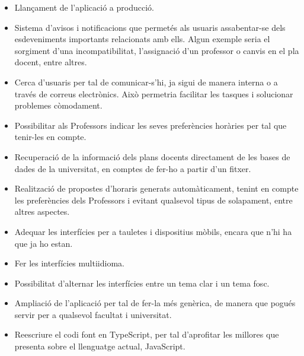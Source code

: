 \documentclass[a4paper,12pt]{ThesisStyle}
\begin{document}
\begin{itemize}
  \item Llançament de l'aplicació a producció.
  \item Sistema d'avisos i notificacions que permetés als usuaris assabentar-se dels esdeveniments importants relacionats amb ells. Algun exemple seria el sorgiment d'una incompatibilitat, l'assignació d'un professor o canvis en el pla docent, entre altres.
  \item Cerca d'usuaris per tal de comunicar-s'hi, ja sigui de manera interna o a través de correus electrònics. Això permetria facilitar les tasques i solucionar problemes còmodament.
  \item Possibilitar als Professors indicar les seves preferències horàries per tal que tenir-les en compte.
  \item Recuperació de la informació dels plans docents directament de les bases de dades de la universitat, en comptes de fer-ho a partir d'un fitxer.
  \item Realització de propostes d'horaris generats automàticament, tenint en compte les preferències dels Professors i evitant qualsevol tipus de solapament, entre altres aspectes.
  \item Adequar les interfícies per a tauletes i dispositius mòbils, encara que n'hi ha que ja ho estan.
  \item Fer les interfícies multiidioma.
  \item Possibilitat d'alternar les interfícies entre un tema clar i un tema fosc.
  \item Ampliació de l'aplicació per tal de fer-la més genèrica, de manera que pogués servir per a qualsevol facultat i universitat.
  \item Reescriure el codi font en TypeScript, per tal d'aprofitar les millores que presenta sobre el llenguatge actual, JavaScript.
\end{itemize}


\backmatter



\end{document}
